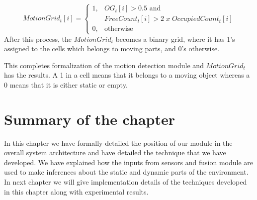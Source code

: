 \begin{equation}
MotionGrid_t[i] = \begin{cases} 1, & \mbox{$OG_t[i] > 0.5$ and} \\ & \mbox {$FreeCount_t[i]>2\;  x \; OccupiedCount_t[i]$} \\
                                0, & \mbox{otherwise}\end{cases}
\end{equation}
After this process, the $MotionGrid_t$ becomes a binary grid, where it has 1's assigned to the cells which belongs to moving parts, and 0's otherwise.

This completes formalization of the motion detection module and $MotionGrid_t$ has the results. A 1 in a cell means that it belongs to a moving object whereas a 0 means that it is either static or empty.





\section{Summary of the chapter}
In this chapter we have formally detailed the position of our module in the overall system architecture and have detailed the technique that we have developed. We have explained how the inputs from sensors and fusion module are used to make inferences about the static and dynamic parts of the environment. In next chapter we will give implementation details of the techniques developed in this chapter along with experimental results.

